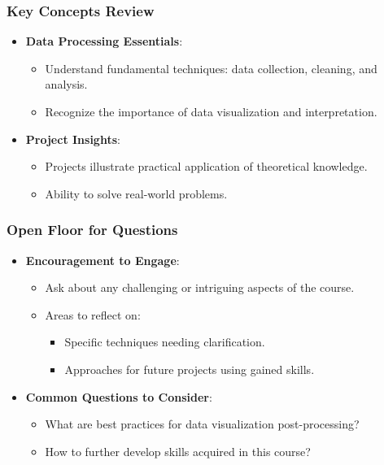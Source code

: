 \documentclass[aspectratio=169]{beamer}
\begin{document}
\begin{frame}[fragile]
    \frametitle{Key Concepts Review}
    \begin{itemize}
        \item \textbf{Data Processing Essentials}:
        \begin{itemize}
            \item Understand fundamental techniques: data collection, cleaning, and analysis.
            \item Recognize the importance of data visualization and interpretation.
        \end{itemize}
        \item \textbf{Project Insights}:
        \begin{itemize}
            \item Projects illustrate practical application of theoretical knowledge.
            \item Ability to solve real-world problems.
        \end{itemize}
    \end{itemize}
\end{frame}

\begin{frame}[fragile]
    \frametitle{Open Floor for Questions}
    \begin{itemize}
        \item \textbf{Encouragement to Engage}:
        \begin{itemize}
            \item Ask about any challenging or intriguing aspects of the course.
            \item Areas to reflect on:
            \begin{itemize}
                \item Specific techniques needing clarification.
                \item Approaches for future projects using gained skills.
            \end{itemize}
        \end{itemize}
        \item \textbf{Common Questions to Consider}:
        \begin{itemize}
            \item What are best practices for data visualization post-processing?
            \item How to further develop skills acquired in this course?
        \end{itemize}
    \end{itemize}
\end{frame}
\end{document}
